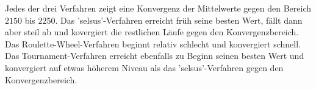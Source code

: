 Jedes der drei Verfahren zeigt eine Konvergenz der Mittelwerte gegen den Bereich 
$2150$ bis $2250$. Das 'selsus'-Verfahren erreicht früh seine besten Wert, fällt
dann aber steil ab und kovergiert die restlichen Läufe gegen den Konvergenzbereich.
Das Roulette-Wheel-Verfahren beginnt relativ schlecht und konvergiert schnell. Das
Tournament-Verfahren erreicht ebenfalls zu Beginn seinen besten Wert und konvergiert
auf etwas höherem Niveau als das 'selsus'-Verfahren gegen den Konvergenzbereich. 
